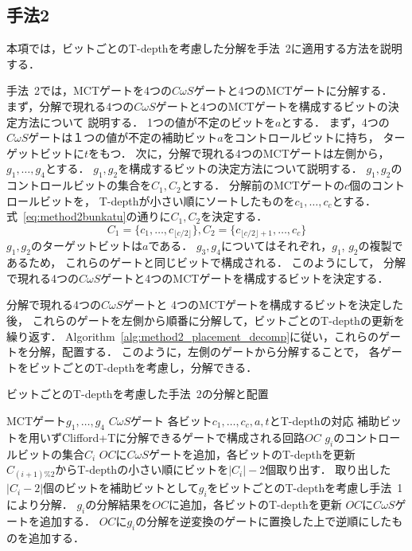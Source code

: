 \subsection{手法2}
本項では，ビットごとのT-depthを考慮した分解を手法~2に適用する方法を説明する．
\par
手法~2では，MCTゲートを4つの$C\omega S$ゲートと4つのMCTゲートに分解する．
まず，分解で現れる4つの$C\omega S$ゲートと4つのMCTゲートを構成するビットの決定方法について
説明する．
1つの値が不定のビットを$a$とする．
まず，4つの$C\omega S$ゲートは１つの値が不定の補助ビット$a$をコントロールビットに持ち，
ターゲットビットに$t$をもつ．
次に，分解で現れる4つのMCTゲートは左側から，$g_{1},\dots, g_{4}$とする．
$g_{1}, g_{2}$を構成するビットの決定方法について説明する．
$g_{1}, g_{2}$のコントロールビットの集合を$C_{1}, C_{2}$とする．
分解前のMCTゲートの$c$個のコントロールビットを，
T-depthが小さい順にソートしたものを$c_{1},\dots, c_{c}$とする．
式~\ref{eq:method2bunkatu}の通りに$C_{1}, C_{2}$を決定する．
\begin{equation}\label{eq:method2bunkatu}
  C_{1}=\{c_{1},\dots, c_{\lfloor c/2 \rfloor}\}, C_{2}=\{c_{\lfloor c/2 \rfloor +1},\dots , c_{c}\}
\end{equation}
$g_{1}, g_{2}$のターゲットビットは$a$である．
$g_{3}, g_{4}$についてはそれぞれ，$g_{1}$, $g_{2}$の複製であるため，
これらのゲートと同じビットで構成される．
このようにして，
分解で現れる4つの$C\omega S$ゲートと4つのMCTゲートを構成するビットを決定する．
\par
分解で現れる4つの$C\omega S$ゲートと
4つのMCTゲートを構成するビットを決定した後，
これらのゲートを左側から順番に分解して，ビットごとのT-depthの更新を繰り返す．
Algorithm~\ref{alg:method2_placement_decomp}に従い，これらのゲートを分解，配置する．
このように，左側のゲートから分解することで，
各ゲートをビットごとのT-depthを考慮し，分解できる．
\begin{algorithm}[tbp]
  \caption{ビットごとのT-depthを考慮した手法~2の分解と配置}
  \label{alg:method2_placement_decomp}
  \begin{algorithmic}[1]
    \Require MCTゲート$g_{1},\dots, g_{4}$
    \Require $C\omega S$ゲート
    \Require 各ビット$c_{1},\dots, c_{c}, a, t$とT-depthの対応
    \Ensure 補助ビットを用いずClifford+Tに分解できるゲートで構成される回路$OC$
    \State $g_{i}$のコントロールビットの集合$C_{i}$
    \State $OC$に$C\omega S$ゲートを追加，各ビットのT-depthを更新
    \State $C_{(i+1)\% 2}$からT-depthの小さい順にビットを$|C_{i}|-2$個取り出す．
    \State 取り出した$|C_{i}-2|$個のビットを補助ビットとして$g_{i}$をビットごとのT-depthを考慮し手法~1により分解．
    \State $g_{i}$の分解結果を$OC$に追加，各ビットのT-depthを更新
    \EndFor
    \State $OC$に$C\omega S$ゲートを追加する．
    \State $OC$に$g_{i}$の分解を逆変換のゲートに置換した上で逆順にしたものを追加する．
    \EndFor
  \end{algorithmic}
\end{algorithm}
